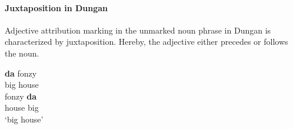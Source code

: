 \paragraph*{Juxtaposition in Dungan}
Adjective attribution marking in the unmarked noun phrase in Dungan is characterized by juxtaposition. Hereby, the adjective either precedes or follows the noun.
\begin{exe}
\label{dungan juxtap}
\begin{xlist}
\ex 	
\gll	\textbf{da} fonzy\\
	big house\\
\ex
\gll	fonzy \textbf{da}\\
	house big\\
\glt	‘big house’
\end{xlist}
\end{exe}


